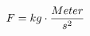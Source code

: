\documentclass[preview]{standalone}
\begin{document}
\begin{align*}
\special{dvisvgm:raw <g id='unique000'>}F = kg \cdot \frac{Meter}{s^{2}}\special{dvisvgm:raw </g>}
\end{align*}
\end{document}
